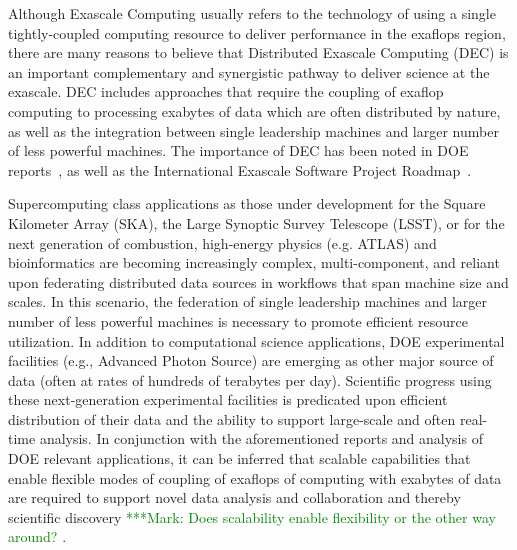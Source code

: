 \documentclass[11pt,final]{article}
\newcommand{\msnote}[1]{ {\textcolor{green} { ***Mark: #1 }}}
\newcommand{\msnote}[1]{}
\begin{document}
{
Although Exascale Computing usually refers to the technology of using
a single tightly-coupled computing resource to deliver performance in
the exaflops region, there are many reasons to believe that
Distributed Exascale Computing (DEC) is an important complementary and
synergistic pathway to deliver science at the exascale.  DEC includes
approaches that require the coupling of exaflop computing to
processing exabytes of data which are often distributed by nature, as well as
the integration between single leadership machines and larger number
of less powerful machines. The importance of DEC has been noted in DOE
reports~\cite{dmav-exa}, as well as the International Exascale
Software Project Roadmap~\cite{iespr}.


Supercomputing class applications as those under development for the
Square Kilometer Array (SKA), the Large Synoptic Survey Telescope
(LSST), or for the next generation of combustion, high-energy physics
(e.g. ATLAS) and bioinformatics are becoming increasingly complex,
multi-component, and reliant upon federating distributed data sources
in workflows that span machine size and scales.  In this scenario, the
federation of single leadership machines and larger number of less
powerful machines is necessary to promote efficient resource
utilization.  In addition to computational science applications, DOE
experimental facilities (e.g., Advanced Photon Source) are emerging as
other major source of data (often at rates of hundreds of terabytes
per day).  Scientific progress using these next-generation
experimental facilities is predicated upon efficient distribution of
their data and the ability to support large-scale and often real-time
analysis.  In conjunction with the aforementioned reports and
analysis %
of DOE relevant applications, it can be inferred that scalable
capabilities that enable flexible modes of coupling of exaflops of
computing with exabytes of data are required to support novel data
analysis and collaboration and thereby scientific discovery\msnote{Does
scalability enable flexibility or the other way around?}.



}
\end{document}
